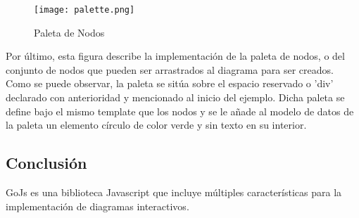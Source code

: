 \vspace{5mm}

\begin{figure}[H]
	\centering
	\texttt{[image: palette.png]}
	\caption{Paleta de Nodos}\label{fig:palette}
\end{figure}
\vspace{5mm}

Por último, esta figura describe la implementación de la paleta de nodos, o del conjunto de nodos que pueden ser arrastrados al diagrama para ser creados. Como se puede observar, la paleta se sitúa sobre el espacio reservado o 'div' declarado con anterioridad y mencionado al inicio del ejemplo. Dicha paleta se define bajo el mismo template que los nodos y se le añade al modelo de datos de la paleta un elemento círculo de color verde y sin texto en su interior.

\subsection{Conclusión}

GoJs es una biblioteca Javascript que incluye múltiples características para la implementación de diagramas interactivos.